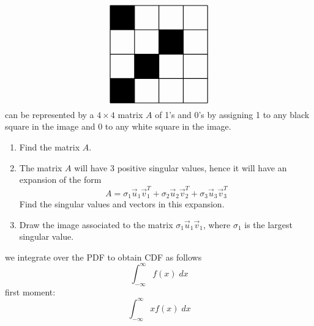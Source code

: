 \documentclass[12pt]{article}
\newcommand*{\GridSize}{4}
\newcommand*{\ColorCells}[1]{%
  \foreach \x/\y/\color in {#1} {
    \node [fill=\color, draw=none, thick, minimum size=1cm] 
      at (\x-.5,\GridSize+0.5-\y) {};
    }%
}%
\begin{document}
\begin{enumerate}
\[\begin{tikzpicture}[scale=1]
    \begin{scope}[thick,local bounding box=name]
        \ColorCells{1/1/black, 2/3/black, 3/2/black, 1/4/black}
        \draw (0, 0) grid (\GridSize, \GridSize);
    \end{scope}

\end{tikzpicture}
\]
can be represented by a $4\times 4$ matrix $A$ of 1's and 0's by assigning 1 to any black square in the image and 0 to any white square in the image.  
\begin{enumerate}
    \item   Find the matrix $A$.  
    \item   The matrix $A$ will have 3 positive singular values, hence it will have an expansion of the form 
    \[
    A = \sigma_{1} \vec{u}_{1}\vec{v}_{1}^{T} + \sigma_{2} \vec{u}_{2}\vec{v}_{2}^{T}  + \sigma_{3} \vec{u}_{3}\vec{v}_{3}^{T} 
    \]
    Find the singular values and vectors in this expansion.  
    \item   Draw the image associated to the matrix $\sigma_{1} \vec{u}_{1} \vec{v}_{1}$, where $\sigma_{1}$ is the largest singular value.
\end{enumerate} 

we integrate over the PDF to obtain CDF as follows
\[
\int_{-\infty}^{\infty} f(x) \; dx
\]
first moment:
\[
\int_{-\infty}^{\infty} xf(x) \; dx
\]

        







\end{enumerate} 
\end{document}
